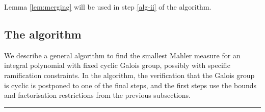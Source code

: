\documentclass[12pt,reqno]{amsart}
\theoremstyle{definition}
\theoremstyle{plain}
\theoremstyle{definition}
\begin{document}
Lemma \ref{lem:merging} will be used in step \eqref{alg-ii} of the algorithm. 



\subsection{The algorithm}
\label{subsec:The algorithm}
We describe a general algorithm to find the smallest Mahler measure for an integral polynomial with fixed cyclic Galois group, possibly with specific ramification constraints. In the algorithm, the verification that the Galois group is cyclic is postponed to one of the final steps, and the first steps use the bounds and factorisation restrictions from the previous subsections. 

\bigskip 

\hrule

\medskip
\end{document}

